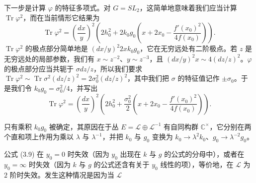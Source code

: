 下一步是计算 $\varphi$ 的特征多项式。对 $G=SL_2$，这简单地意味着我们应当计算 $\operatorname{Tr}\varphi^2$，而在当前情形它结果为
\begin{equation}\tag{3.10}
\operatorname{Tr}\varphi^2=\left(\frac{dx}{y}\right)^2\left(2h_0^2+2k_0g_0\left(x+2x_0-\frac{f'(x_0)^2}{4f(x_0)}\right)\right).
\end{equation}
$\operatorname{Tr}\varphi^2$ 的极点部分简单地是 $(dx/y)^2 2xk_0g_0$，它在无穷远处有二阶极点。若 $z$ 是无穷远处的局部参数，我们有 $x\sim z^{-2}$、$y\sim z^{-3}$，且 $(dx/y)^2x\sim 4(dz/z)^2$。$\varphi$ 的极点部分应当共轭于 $\sigma dz/z$，所以我们要求 $\operatorname{Tr}\varphi^2\sim\operatorname{Tr}\sigma^2(dz/z)^2=2\sigma_0^2(dz/z)^2$，其中我们把 $\sigma$ 的特征值记作 $\pm\sigma_0$。于是我们令 $k_0g_0=\sigma_0^2/4$，并写出
\begin{equation}\tag{3.11}
\operatorname{Tr}\varphi^2=\left(\frac{dx}{y}\right)^2\left(2h_0^2+\frac{\sigma_0^2}{2}\left(x+2x_0-\frac{f'(x_0)^2}{4f(x_0)}\right)\right).
\end{equation}

只有乘积 $k_0g_0$ 被确定，其原因在于丛 $E=\mathcal{L}\oplus\mathcal{L}^{-1}$ 有自同构群 $\mathbb{C}^\times$，它分别在两个直和项上作用为乘以 $\lambda$ 与 $\lambda^{-1}$，并把 $k_0$ 与 $g_0$ 变换为 $k_0\to\lambda^2k_0$、$g_0\to\lambda^{-2}g_0$。

公式 (3.9) 在 $y_0=0$ 时失效（因为 $y_0$ 出现在 $k$ 与 $g$ 的公式的分母中），或者在 $y_0=\infty$ 时失效（因为 $k$ 与 $g$ 的公式还含有关于 $y_0$ 线性的项），等价地，在 $\mathcal{L}$ 为 $2$ 阶时失效。发生这种情况是因为当 $\mathcal{L}$



